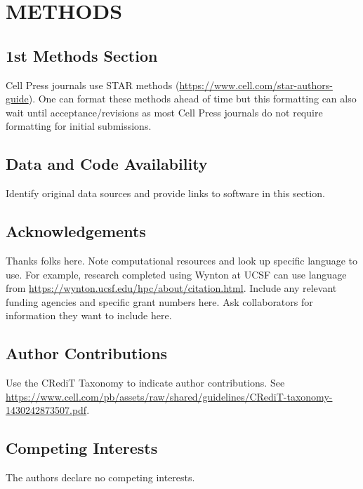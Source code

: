 \section{METHODS}
\methodsTips %
\subsection{1st Methods Section}
Cell Press journals use STAR methods (\url{https://www.cell.com/star-authors-guide}). One can format these methods ahead of time but this formatting can also wait until acceptance/revisions as most Cell Press journals do not require formatting for initial submissions.

\subsection{Data and Code Availability}
Identify original data sources and provide links to software in this section.

\subsection{Acknowledgements}
Thanks folks here. Note computational resources and look up specific language to use. For example, research completed using Wynton at UCSF can use language from \url{https://wynton.ucsf.edu/hpc/about/citation.html}. Include any relevant funding agencies and specific grant numbers here. Ask collaborators for information they want to include here.

\subsection{Author Contributions}
Use the CRediT Taxonomy to indicate author contributions. See \url{https://www.cell.com/pb/assets/raw/shared/guidelines/CRediT-taxonomy-1430242873507.pdf}.

\subsection{Competing Interests}
The authors declare no competing interests.